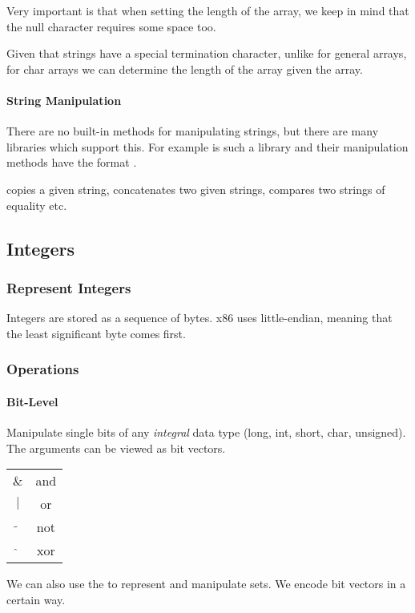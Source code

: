 Very important is that when setting the length of the array, we keep in mind that the null character requires some space too.

Given that strings have a special termination character, unlike for general arrays, for char arrays we can determine the length of the array given the array.

\paragraph{String Manipulation}
There are no built-in methods for manipulating strings, but there are many libraries which support this. For example  is such a library and their manipulation methods have the format .

 copies a given string,  concatenates two given strings,  compares two strings of equality etc.

\subsection*{Integers}

\subsubsection{Represent Integers}
Integers are stored as a sequence of bytes. x86 uses little-endian, meaning that the least significant byte comes first.

\subsubsection{Operations}
\paragraph{Bit-Level}
Manipulate single bits of any \textit{integral} data type (long, int, short, char, unsigned). The arguments can be viewed as bit vectors.

\begin{tabular}{c | c}
    $\&$ & and\\
    $|$ & or\\
    $\tilde{}$ & not\\
    $\hat{}$ & xor
\end{tabular}

We can also use the to represent and manipulate sets. We encode bit vectors in a certain way.

